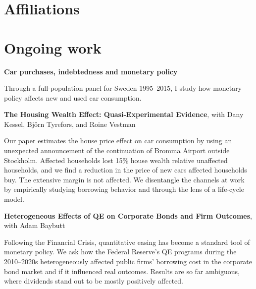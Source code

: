\documentclass{clean_cv}
\begin{document}
\section{Affiliations}

\begin{datetabular}{6em}



\end{datetabular}

\section{Ongoing work}

\textbf{Car purchases, indebtedness and monetary policy}

Through a full-population panel for Sweden 1995--2015, I study how monetary policy affects new and used car consumption.

\medskip

\textbf{The Housing Wealth Effect: Quasi-Experimental Evidence}, with Dany Kessel, Björn Tyrefors, and Roine Vestman

Our paper estimates the house price effect on car consumption by using an unexpected announcement of the continuation of Bromma Airport outside Stockholm. Affected households lost 15\% house wealth relative unaffected households, and we find a reduction in the price of new cars affected households buy. The extensive margin is not affected. We disentangle the channels at work by empirically studying borrowing behavior and through the lens of a life-cycle model.

\medskip

\textbf{Heterogeneous Effects of QE on Corporate Bonds and Firm Outcomes}, with Adam Baybutt

Following the Financial Crisis, quantitative easing has become a standard tool of monetary policy. We ask how the Federal Reserve's QE programs during the 2010--2020s heterogeneously affected public firms' borrowing cost in the corporate bond market and if it influenced real outcomes. Results are so far ambiguous, where dividends stand out to be mostly positively affected.
\end{document}
